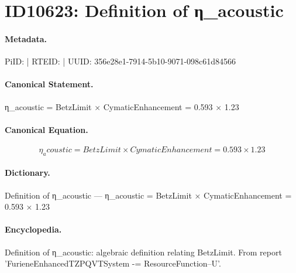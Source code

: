 \section*{ID10623: Definition of η\_acoustic}
\paragraph{Metadata.}
PiID:  | RTEID:  | UUID: 356e28e1-7914-5b10-9071-098c61d84566

\paragraph{Canonical Statement.}
η\_acoustic = BetzLimit × CymaticEnhancement = 0.593 × 1.23

\paragraph{Canonical Equation.}
\[
η_acoustic = BetzLimit × CymaticEnhancement = 0.593 × 1.23
\]

\paragraph{Dictionary.}
Definition of η\_acoustic — η\_acoustic = BetzLimit × CymaticEnhancement = 0.593 × 1.23

\paragraph{Encyclopedia.}
Definition of η\_acoustic: algebraic definition relating BetzLimit. From report 'FurieneEnhancedTZPQVTSystem -= ResourceFunction--U'.
